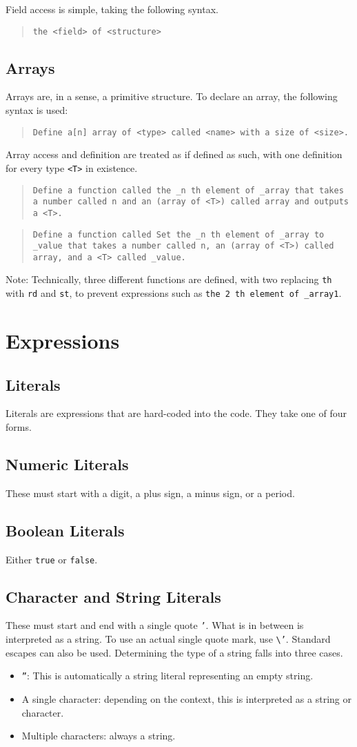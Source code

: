 \documentclass{article}
\newcommand{\code}[1]{\texttt{#1}}
\newcommand{\codeblock}[1]{\begin{quote}\code{#1}\end{quote}}
\begin{document}
Field access is simple, taking the following syntax.

\codeblock{the <field> of <structure>}

\subsection{Arrays}
Arrays are, in a sense, a primitive structure. To declare an array, the following syntax is used:

\codeblock{Define a[n] array of <type> called <name> with a size of <size>.}

Array access and definition are treated as if defined as such, with one definition for every type \code{<T>} in existence.

\codeblock{Define a function called the \_{n} th element of \_{array} that takes a number called n and an (array of <T>) called array and outputs a <T>.}

\codeblock{Define a function called Set the \_{n} th element of \_{array} to \_{value} that takes a number called n, an (array of <T>) called array, and a <T> called \_{}value.}

Note: Technically, three different functions are defined, with two replacing \code{th} with \code{rd} and \code{st}, to prevent expressions such as \code{the 2 th element of \_{}array1}.

\section{Expressions}
\subsection{Literals}
Literals are expressions that are hard-coded into the code. They take one of four forms.
\subsection{Numeric Literals}
These must start with a digit, a plus sign, a minus sign, or a period.
\subsection{Boolean Literals}
Either \code{true} or \code{false}.
\subsection{Character and String Literals}
These must start and end with a single quote \code{'}. What is in between is interpreted as a string. To use an actual single quote mark, use \code{\textbackslash'}. Standard escapes can also be used. Determining the type of a string falls into three cases.
\begin{itemize}
\item \code{''}: This is automatically a string literal representing an empty string.
\item A single character: depending on the context, this is interpreted as a string or character.
\item Multiple characters: always a string.
\end{itemize}
\end{document}
